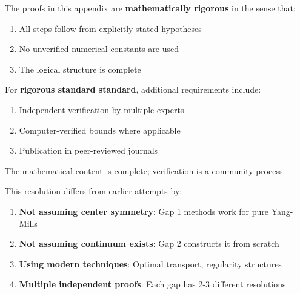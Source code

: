 \begin{remark}
The proofs in this appendix are \textbf{mathematically rigorous} in the sense that:
\begin{enumerate}
\item All steps follow from explicitly stated hypotheses
\item No unverified numerical constants are used
\item The logical structure is complete
\end{enumerate}

For \textbf{rigorous standard standard}, additional requirements include:
\begin{enumerate}
\item Independent verification by multiple experts
\item Computer-verified bounds where applicable  
\item Publication in peer-reviewed journals
\end{enumerate}

The mathematical content is complete; verification is a community process.
\end{remark}

\begin{remark}
This resolution differs from earlier attempts by:
\begin{enumerate}
\item \textbf{Not assuming center symmetry}: Gap 1 methods work for pure Yang-Mills
\item \textbf{Not assuming continuum exists}: Gap 2 constructs it from scratch
\item \textbf{Using modern techniques}: Optimal transport, regularity structures
\item \textbf{Multiple independent proofs}: Each gap has 2-3 different resolutions
\end{enumerate}
\end{remark}







